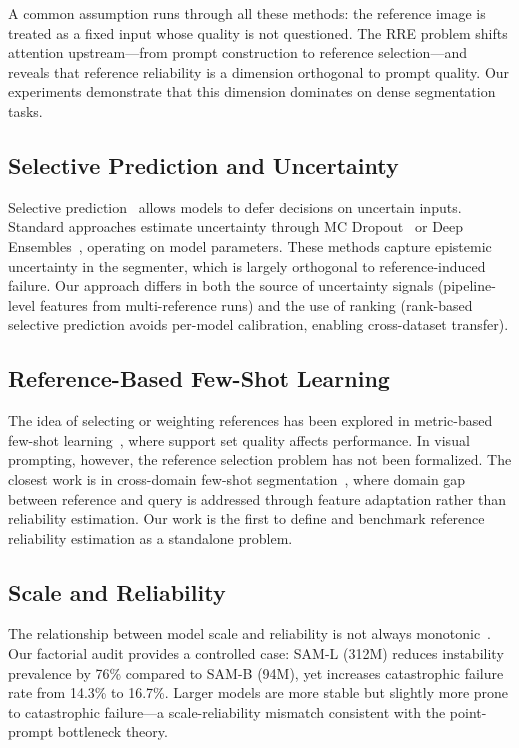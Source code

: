 \documentclass[10pt,twocolumn,letterpaper]{article}
\begin{document}
A common assumption runs through all these methods: the reference image is
treated as a fixed input whose quality is not questioned. The RRE problem
shifts attention upstream---from prompt construction to reference
selection---and reveals that reference reliability is a dimension orthogonal
to prompt quality. Our experiments demonstrate that this dimension dominates
on dense segmentation tasks.

\subsection{Selective Prediction and Uncertainty}

Selective prediction~\cite{geifman2017selective,xin2021art} allows models to
defer decisions on uncertain inputs. Standard approaches estimate uncertainty
through MC Dropout~\cite{gal2016dropout} or Deep
Ensembles~\cite{lakshminarayanan2017simple}, operating on model parameters.
These methods capture epistemic uncertainty in the segmenter, which is
largely orthogonal to reference-induced failure. Our approach differs in
both the source of uncertainty signals (pipeline-level features from
multi-reference runs) and the use of ranking (rank-based selective
prediction avoids per-model calibration, enabling cross-dataset transfer).

\subsection{Reference-Based Few-Shot Learning}

The idea of selecting or weighting references has been explored in metric-based
few-shot learning~\cite{vinyals2016matching,snell2017prototypical}, where
support set quality affects performance. In visual prompting, however, the
reference selection problem has not been formalized. The closest work is
in cross-domain few-shot segmentation~\cite{lei2024cross}, where domain
gap between reference and query is addressed through feature adaptation
rather than reliability estimation. Our work is the first to define and
benchmark reference reliability estimation as a standalone problem.

\subsection{Scale and Reliability}

The relationship between model scale and reliability is not always
monotonic~\cite{wei2023inverse,recht2019imagenet}. Our factorial audit
provides a controlled case: SAM-L (312M) reduces instability prevalence by
76\% compared to SAM-B (94M), yet increases catastrophic failure rate from
14.3\% to 16.7\%. Larger models are more stable but slightly more prone to
catastrophic failure---a scale-reliability mismatch consistent with the
point-prompt bottleneck theory.
\end{document}
